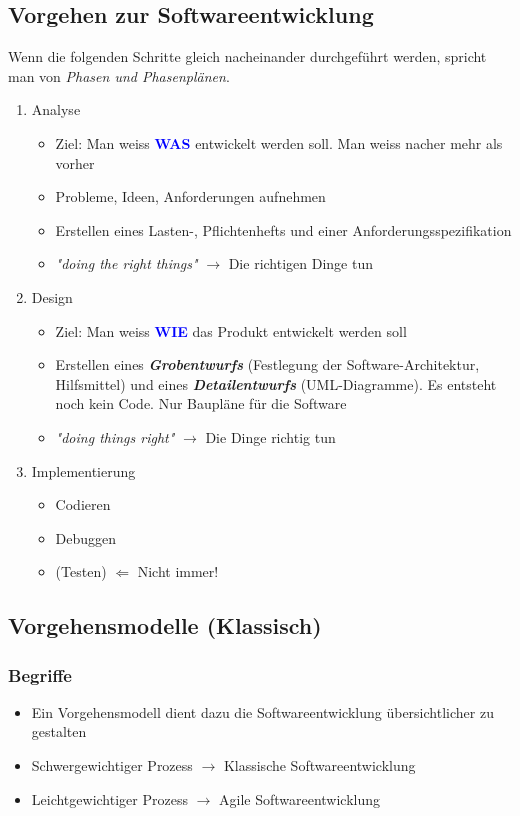 \subsection{Vorgehen zur Softwareentwicklung}
Wenn die folgenden Schritte gleich nacheinander durchgeführt werden, spricht man von \textit{Phasen und Phasenplänen}.
	\begin{enumerate}
		\item Analyse
			\begin{itemize}
				\item Ziel: Man weiss \textbf{\textcolor{blue}{WAS}} entwickelt werden soll.
                \subitem \rightarrow Man weiss nacher mehr als vorher
				\item Probleme, Ideen, Anforderungen aufnehmen
				\item Erstellen eines Lasten-, Pflichtenhefts und einer Anforderungsspezifikation
				\item \textit{"doing the right things"} $\rightarrow$ Die richtigen Dinge tun
			\end{itemize}
		\item Design
			\begin{itemize}
				\item Ziel: Man weiss \textbf{\textcolor{blue}{WIE}} das Produkt entwickelt werden soll
				\item Erstellen eines \textbf{\textit{Grobentwurfs}} (Festlegung der Software-Architektur, Hilfsmittel) und \newline eines \textbf{\textit{Detailentwurfs}} (UML-Diagramme). Es entsteht noch kein Code. Nur Baupläne für die Software
				\item \textit{"doing things right"} $\rightarrow$ Die Dinge richtig tun
			\end{itemize}
		\item Implementierung
			\begin{itemize}
				\item Codieren
				\item Debuggen
				\item (Testen) $\Leftarrow$ Nicht immer!
			\end{itemize}
	\end{enumerate}

\subsection{Vorgehensmodelle (Klassisch)}
\subsubsection{Begriffe}
\begin{itemize}
	\item Ein Vorgehensmodell dient dazu die Softwareentwicklung übersichtlicher zu gestalten
	\item Schwergewichtiger Prozess $\rightarrow$ Klassische Softwareentwicklung
	\item Leichtgewichtiger Prozess $\rightarrow$ Agile Softwareentwicklung
\end{itemize}

